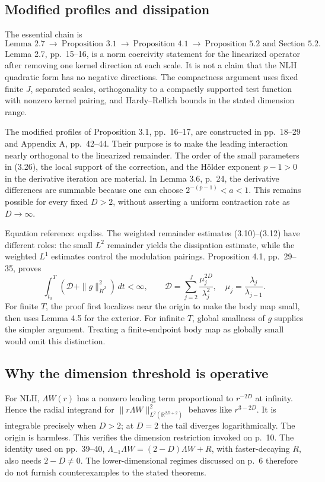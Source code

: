 \documentclass[10pt]{article}
\begin{document}
\subsection*{Modified profiles and dissipation}
The essential chain is \[\text{Lemma 2.7}\ \longrightarrow\ \text{Proposition 3.1}\
 \longrightarrow\ \text{Proposition 4.1}\
 \longrightarrow\ \text{Proposition 5.2 and Section 5.2}.\] Lemma 2.7, pp. 15–16, is a norm coercivity statement for the linearized operator after removing one kernel direction at each scale. It is not a claim that the NLH quadratic form has no negative directions. The compactness argument uses fixed finite \(J\), separated scales, orthogonality to a compactly supported test function with nonzero kernel pairing, and Hardy–Rellich bounds in the stated dimension range.\par
The modified profiles of Proposition 3.1, pp. 16–17, are constructed in pp. 18–29 and Appendix A, pp. 42–44. Their purpose is to make the leading interaction nearly orthogonal to the linearized remainder. The order of the small parameters in (3.26), the local support of the correction, and the Hölder exponent \(p-1>0\) in the derivative iteration are material. In Lemma 3.6, p. 24, the derivative differences are summable because one can choose \(2^{-(p-1)}<a<1\). This remains possible for every fixed \(D>2\), without asserting a uniform contraction rate as \(D\to\infty\).\par
Equation reference: eq:diss. The weighted remainder estimates (3.10)–(3.12) have different roles: the small \(L^2\) remainder yields the dissipation estimate, while the weighted \(L^1\) estimates control the modulation pairings. Proposition 4.1, pp. 29–35, proves \[
 \int_{t_0}^{T}\left(\mathcal D+\|g\|_{\dot H^2}^2\right)\,dt<\infty,
 \qquad
 \mathcal D=\sum_{j=2}^J\frac{\mu_j^{2D}}{\lambda_j^2},
 \quad \mu_j=\frac{\lambda_j}{\lambda_{j-1}}.\] For finite \(T\), the proof first localizes near the origin to make the body map small, then uses Lemma 4.5 for the exterior. For infinite \(T\), global smallness of \(g\) supplies the simpler argument. Treating a finite-endpoint body map as globally small would omit this distinction.\par
\subsection*{Why the dimension threshold is operative}
For NLH, \(\Lambda W(r)\) has a nonzero leading term proportional to \(r^{-2D}\) at infinity. Hence the radial integrand for \(\|r\Lambda W\|_{L^2(\mathbb R^{2D+2})}^2\) behaves like \(r^{3-2D}\). It is integrable precisely when \(D>2\); at \(D=2\) the tail diverges logarithmically. The origin is harmless. This verifies the dimension restriction invoked on p. 10. The identity used on pp. 39–40, \(\Lambda_{-1}\Lambda W=(2-D)\Lambda W+R\), with faster-decaying \(R\), also needs \(2-D\ne0\). The lower-dimensional regimes discussed on p. 6 therefore do not furnish counterexamples to the stated theorems.\par
\end{document}
